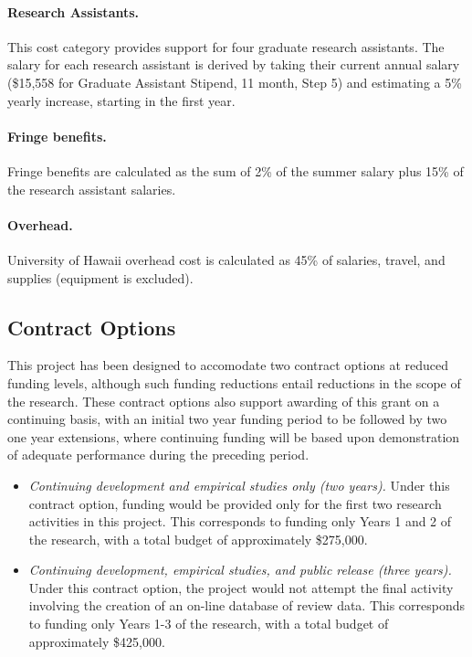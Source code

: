 \paragraph{Research Assistants.}  
This cost category provides support for four graduate research
assistants.  The salary for each research assistant is derived by
taking their current annual salary (\$15,558 for Graduate Assistant
Stipend, 11 month, Step 5) and estimating a 5\% yearly increase, 
starting in the first year.

\paragraph{Fringe benefits.} 
Fringe benefits are calculated as the sum of 2\% of the summer salary
plus 15\% of the research assistant salaries.

\paragraph{Overhead.}  
University of Hawaii overhead cost is calculated as 45\% of
salaries, travel, and supplies (equipment is excluded).


\subsection{Contract Options}

This project has been designed to accomodate two contract options at
reduced funding levels, although such funding reductions entail reductions
in the scope of the research.  These contract options also support awarding
of this grant on a continuing basis, with an initial two year funding
period to be followed by two one year extensions, where continuing funding
will be based upon demonstration of adequate performance during the
preceding period.

\begin{itemize}
\item {\em Continuing development and empirical studies only (two years).}
  Under this contract option, funding would be provided only for the first
  two research activities in this project.  This corresponds to funding 
  only Years 1 and 2 of the research, with a total budget of approximately
  \$275,000.  
  
\item {\em Continuing development, empirical studies, and public release
  (three years).} Under this contract option, the project would not attempt
  the final activity involving the creation of an on-line database of
  review data.  This corresponds to funding only Years 1-3 of the research,
  with a total budget of approximately \$425,000. 
 
\end{itemize}








